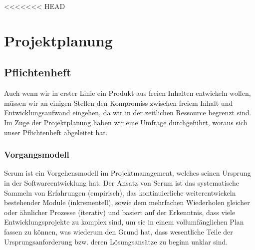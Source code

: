 <<<<<<< HEAD
%
%
%
%

\chapter{Projektplanung} \label{Projektplanung}
\section{Pflichtenheft} \label{Pflichtenheft}

Auch wenn wir in erster Linie ein Produkt aus freien Inhalten entwickeln wollen, müssen wir an einigen Stellen den Kompromiss zwischen freiem Inhalt und Entwicklungsaufwand eingehen, da wir in der zeitlichen Ressource begrenzt sind.
Im Zuge der Projektplanung haben wir eine Umfrage durchgeführt, woraus sich unser Pflichtenheft abgeleitet hat.

% 	
% 	
% 	
% 


\subsection{Vorgangsmodell} \label{Vorgangsmodell}
Scrum ist ein Vorgehensmodell im Projektmanagement, welches seinen Ursprung in der Softwareentwicklung hat.
Der Ansatz von Scrum ist das systematische Sammeln von Erfahrungen (empirisch), das kontinuierliche weiterentwickeln bestehender Module (inkrementell), sowie dem mehrfachen Wiederholen gleicher oder ähnlicher Prozesse (iterativ) und basiert auf der Erkenntnis, dass viele Entwicklungsprojekte zu komplex sind, um sie in einem vollumfänglichen Plan fassen zu können, was wiederum den Grund hat, dass wesentliche Teile der Ursprungsanforderung bzw. deren Lösungsansätze zu beginn unklar sind.

